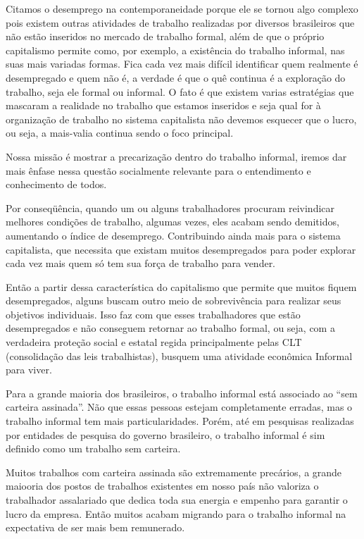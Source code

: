 Citamos o desemprego na contemporaneidade porque ele se tornou algo complexo pois existem outras atividades de trabalho realizadas por diversos brasileiros que não estão inseridos no mercado de trabalho formal, além de que o próprio capitalismo permite como, por exemplo, a existência do trabalho informal, nas suas mais variadas formas. Fica cada vez mais difícil identificar quem realmente é desempregado e quem não é, a verdade é que o quê continua é a exploração do trabalho, seja ele formal ou informal. O fato é que existem varias estratégias que mascaram a realidade no trabalho que estamos inseridos e seja qual for à organização de trabalho no sistema capitalista não devemos esquecer que o lucro, ou seja, a mais-valia continua sendo o foco principal.

Nossa missão é mostrar a precarização dentro do trabalho informal, iremos dar mais ênfase nessa questão socialmente relevante para o entendimento e conhecimento de todos.

Por conseqüência, quando um ou alguns trabalhadores procuram reivindicar melhores condições de trabalho, algumas vezes, eles acabam sendo demitidos, aumentando o índice de desemprego. Contribuindo ainda mais para o sistema capitalista, que necessita que existam muitos desempregados para poder explorar cada vez mais quem só tem sua força de trabalho para vender.

Então a partir dessa característica do capitalismo que permite que muitos fiquem desempregados, alguns buscam outro meio de sobrevivência para realizar seus objetivos individuais. Isso faz com que esses trabalhadores que estão desempregados e não conseguem retornar ao trabalho formal, ou seja, com a verdadeira proteção social e estatal regida principalmente pelas CLT (consolidação das leis trabalhistas), busquem uma atividade econômica Informal para viver. 

Para a grande maioria dos brasileiros, o trabalho informal está associado ao ``sem carteira assinada''. Não que essas pessoas estejam completamente erradas, mas o trabalho informal tem mais particularidades. Porém, até em pesquisas realizadas por entidades de pesquisa do governo brasileiro, o trabalho informal é sim definido como um trabalho sem carteira.

Muitos trabalhos com carteira assinada são extremamente precários, a grande maiooria dos postos de trabalhos existentes em nosso país não valoriza o trabalhador assalariado que dedica toda sua energia e empenho para garantir o lucro da empresa. Então muitos acabam migrando para o trabalho informal na expectativa de ser mais bem remunerado.

